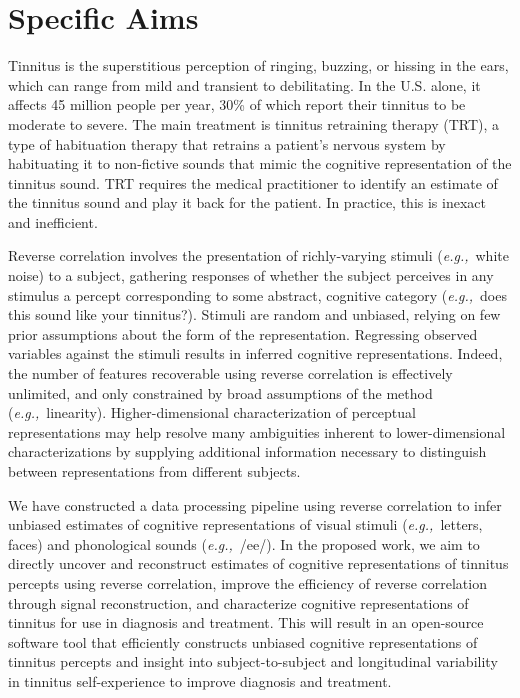 \documentclass[11pt]{nih}
\def\mydate{2005-06-09 13:58:03 brd}
\def\eg{{\emph{e.g.,}}~}
\begin{document}
\bigskip

\appendix 


\setcounter{page}{20} %


\section{Specific Aims}

Tinnitus is the superstitious perception of ringing, buzzing, or hissing in the ears, which can range from mild and transient to debilitating.
In the U.S. alone, it affects 45 million people per year, 30\% of which report their tinnitus to be moderate to severe.
The main treatment is tinnitus retraining therapy (TRT),
a type of habituation therapy that retrains a patient's nervous system by habituating it to non-fictive sounds that mimic the cognitive representation of the tinnitus sound.
TRT requires the medical practitioner to identify an estimate of the tinnitus sound and play it back for the patient.
In practice, this is inexact and inefficient.

Reverse correlation involves the presentation of richly-varying stimuli (\eg white noise) to a subject,
gathering responses of whether the subject perceives in any stimulus a percept corresponding to some abstract, cognitive category (\eg does this sound like your tinnitus?).
Stimuli are random and unbiased, relying on few prior assumptions about the form of the representation.
Regressing observed variables against the stimuli results in inferred cognitive representations.
Indeed, the number of features
recoverable using reverse correlation is effectively unlimited, and only constrained by broad
assumptions of the method (\eg linearity). Higher-dimensional characterization of perceptual
representations may help resolve many ambiguities inherent to lower-dimensional characterizations by
supplying additional information necessary to distinguish between representations from different subjects.

We have constructed a data processing pipeline using reverse correlation to infer unbiased estimates of cognitive representations of visual stimuli (\eg letters, faces) and phonological sounds (\eg /ee/).
In the proposed work, we aim to directly uncover and reconstruct estimates of cognitive representations of tinnitus percepts using reverse correlation,
improve the efficiency of reverse correlation through signal reconstruction,
and characterize cognitive representations of tinnitus for use in diagnosis and treatment.
This will result in an open-source software tool that efficiently constructs unbiased cognitive representations of tinnitus percepts
and insight into subject-to-subject and longitudinal variability in tinnitus self-experience to improve diagnosis and treatment.
\end{document}

